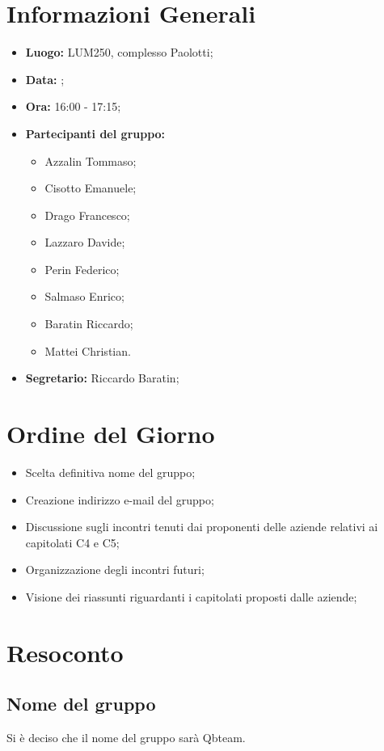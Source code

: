 \section{Informazioni Generali}
\begin{itemize}
\item \textbf{Luogo:} LUM250, complesso Paolotti;
\item \textbf{Data:} \Data;
\item \textbf{Ora:} 16:00 - 17:15;
\item \textbf{Partecipanti del gruppo:}
	\begin{itemize}
	\item Azzalin Tommaso; 
	\item Cisotto Emanuele; 
	\item Drago Francesco;
	\item Lazzaro Davide;
	\item Perin Federico;
	\item Salmaso Enrico;
	\item Baratin Riccardo;
	\item Mattei Christian.
	\end{itemize} 
\item \textbf{Segretario:} Riccardo Baratin;
\end{itemize}

\clearpage

\section{Ordine del Giorno}
\begin{itemize}
	\item Scelta definitiva nome del gruppo;
	\item Creazione indirizzo e-mail del gruppo;
	\item Discussione sugli incontri tenuti dai proponenti delle aziende relativi ai capitolati C4 e C5;
	\item Organizzazione degli incontri futuri;
	\item Visione dei riassunti riguardanti i capitolati proposti dalle aziende;
	
\end{itemize}

\clearpage

\section{Resoconto}
\subsection{Nome del gruppo}
Si è deciso che il nome del gruppo sarà Qbteam.\\

